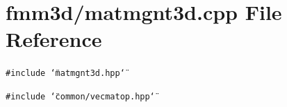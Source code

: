 \section{fmm3d/matmgnt3d.cpp File Reference}
\label{matmgnt3d_8cpp}


{\tt \#include \char`\"{}matmgnt3d.hpp\char`\"{}}\par
{\tt \#include \char`\"{}common/vecmatop.hpp\char`\"{}}\par
